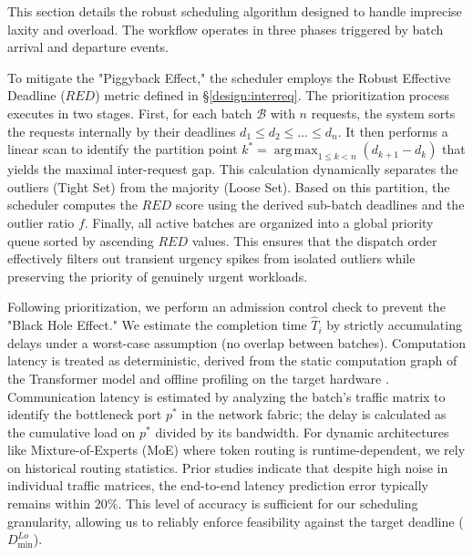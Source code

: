 This section details the robust scheduling algorithm designed to handle imprecise laxity and overload. The workflow operates in three phases triggered by batch arrival and departure events.

To mitigate the "Piggyback Effect," the scheduler employs the Robust Effective Deadline ($RED$) metric defined in \S\ref{design:interreq}. The prioritization process executes in two stages. First, for each batch $\mathcal{B}$ with $n$ requests, the system sorts the requests internally by their deadlines $d_1 \le d_2 \le \dots \le d_n$. It then performs a linear scan to identify the partition point $k^* = \operatorname*{arg\,max}_{1 \le k < n} (d_{k+1} - d_k)$ that yields the maximal inter-request gap. This calculation dynamically separates the outliers (Tight Set) from the majority (Loose Set). Based on this partition, the scheduler computes the $RED$ score using the derived sub-batch deadlines and the outlier ratio $f$. Finally, all active batches are organized into a global priority queue sorted by ascending $RED$ values. This ensures that the dispatch order effectively filters out transient urgency spikes from isolated outliers while preserving the priority of genuinely urgent workloads.

 Following prioritization, we perform an admission control check to prevent the "Black Hole Effect." We estimate the completion time $\widehat{T}_i$ by strictly accumulating delays under a worst-case assumption (no overlap between batches). Computation latency is treated as deterministic, derived from the static computation graph of the Transformer model and offline profiling on the target hardware \cite{agrawal2024vidur,distserve,mooncake}. Communication latency is estimated by analyzing the batch's traffic matrix to identify the bottleneck port $p^*$ in the network fabric; the delay is calculated as the cumulative load on $p^*$ divided by its bandwidth. For dynamic architectures like Mixture-of-Experts (MoE) where token routing is runtime-dependent, we rely on historical routing statistics. Prior studies \cite{li2025optimizing} indicate that despite high noise in individual traffic matrices, the end-to-end latency prediction error typically remains within 20\%. This level of accuracy is sufficient for our scheduling granularity, allowing us to reliably enforce feasibility against the target deadline ($D^{Lo}_{\min}$).

